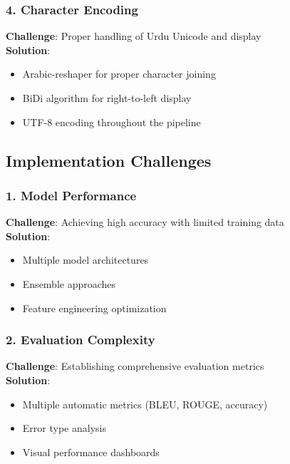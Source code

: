 \documentclass[10pt,twocolumn]{article}
\begin{document}
\subsubsection*{4. Character Encoding}
\textbf{Challenge}: Proper handling of Urdu Unicode and display\\
\textbf{Solution}:
\begin{itemize}[leftmargin=*,noitemsep,topsep=0pt,parsep=0pt,partopsep=0pt]
    \item Arabic-reshaper for proper character joining
    \item BiDi algorithm for right-to-left display
    \item UTF-8 encoding throughout the pipeline
\end{itemize}

\subsection{Implementation Challenges}

\subsubsection*{1. Model Performance}
\textbf{Challenge}: Achieving high accuracy with limited training data\\
\textbf{Solution}:
\begin{itemize}[leftmargin=*,noitemsep,topsep=0pt,parsep=0pt,partopsep=0pt]
    \item Multiple model architectures
    \item Ensemble approaches
    \item Feature engineering optimization
\end{itemize}

\subsubsection*{2. Evaluation Complexity}
\textbf{Challenge}: Establishing comprehensive evaluation metrics\\
\textbf{Solution}:
\begin{itemize}[leftmargin=*,noitemsep,topsep=0pt,parsep=0pt,partopsep=0pt]
    \item Multiple automatic metrics (BLEU, ROUGE, accuracy)
    \item Error type analysis
    \item Visual performance dashboards
\end{itemize}
\end{document}
